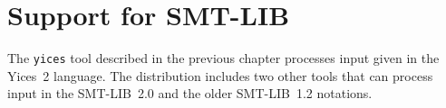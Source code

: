 \documentclass[11pt,twoside,fleqn,openright,titlepage]{cslreport}
\begin{document}















\chapter{Support for SMT-LIB}
\label{yices-smt}

The \texttt{yices} tool described in the previous chapter processes
input given in the Yices~2 language. The distribution includes two
other tools that can process input in the SMT-LIB~2.0 and the older
SMT-LIB~1.2 notations.
\end{document}
